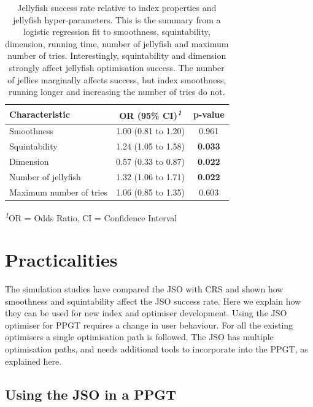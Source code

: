 \documentclass[
  12pt,
]{interact}
\theoremstyle{plain}
\begin{document}
\hypertarget{tbl-mod-output}{}
\begingroup
\fontsize{12.0pt}{14.4pt}\selectfont
\setlength{\LTpost}{0mm}
\begin{longtable}{lcc}
\caption{\label{tbl-mod-output}Jellyfish success rate relative to index properties and jellyfish
hyper-parameters. This is the summary from a logistic regression fit to
smoothness, squintability, dimension, running time, number of jellyfish
and maximum number of tries. Interestingly, squintability and dimension
strongly affect jellyfish optimisation success. The number of jellies
marginally affects success, but index smoothness, running longer and
increasing the number of tries do not. }\tabularnewline

\toprule
\textbf{Characteristic} & \textbf{OR} \textbf{(95\% CI)}\textsuperscript{\textit{1}} & \textbf{p-value} \\ 
\midrule\addlinespace[2.5pt]
Smoothness & 1.00 (0.81 to 1.20) & 0.961 \\ 
Squintability & 1.24 (1.05 to 1.58) & {\bfseries 0.033} \\ 
Dimension & 0.57 (0.33 to 0.87) & {\bfseries 0.022} \\ 
Number of jellyfish & 1.32 (1.06 to 1.71) & {\bfseries 0.022} \\ 
Maximum number of tries & 1.06 (0.85 to 1.35) & 0.603 \\ 
\bottomrule
\end{longtable}
\begin{minipage}{\linewidth}
\textsuperscript{\textit{1}}OR = Odds Ratio, CI = Confidence Interval\\
\end{minipage}
\endgroup

\hypertarget{sec-discussion}{%
\section{Practicalities}\label{sec-discussion}}

The simulation studies have compared the JSO with CRS and shown how
smoothness and squintability affect the JSO success rate. Here we
explain how they can be used for new index and optimiser development.
Using the JSO optimiser for PPGT requires a change in user behaviour.
For all the existing optimisers a single optimisation path is followed.
The JSO has multiple optimisation paths, and needs additional tools to
incorporate into the PPGT, as explained here.

\hypertarget{using-the-jso-in-a-ppgt}{%
\subsection{Using the JSO in a PPGT}\label{using-the-jso-in-a-ppgt}}
\end{document}
